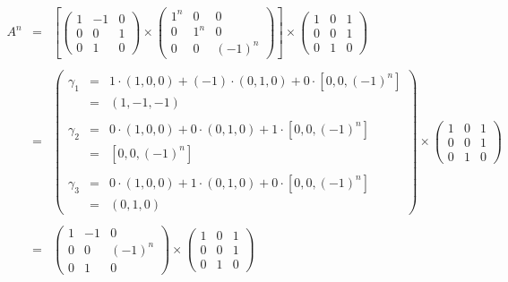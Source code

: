 \begin{enumerate}
    $$\begin{array}{rcl}
	 A^n &=& \left[\left(\begin{array}{*{3}{r}}
	    1 & -1 & 0 \\
	    0 & 0 & 1 \\
	    0 & 1 & 0 
	\end{array}\right) 
	\times 
	\left(\begin{array}{*{3}{llc}}
	    1^n & 0 & 0 \\
	    0 & 1^n & 0 \\
	    0 & 0 & (-1)^n
	\end{array}\right)\right] 
	\times 
	\left(\begin{array}{*{3}{r}}
	    1 & 0 & 1 \\
	    0 & 0 & 1  \\
	    0 & 1 & 0
	\end{array}\right)\\\\
	&=&
	\left(\begin{array}{rcl}
	    \gamma_1 &=& 1\cdot(1,0,0)+(-1)\cdot(0,1,0)+0\cdot\left[0,0,(-1)^n\right]\\
		     &=&(1,-1,-1)\\\\
	    \gamma_2 &=& 0\cdot(1,0,0)+0\cdot(0,1,0)+1\cdot\left[0,0,(-1)^n\right]\\
		     &=&\left[0,0,(-1)^n\right]\\\\
	    \gamma_3 &=& 0\cdot(1,0,0)+1\cdot(0,1,0)+0\cdot\left[0,0,(-1)^n\right]\\
		     &=&(0,1,0)
	\end{array}\right)
	\times 
	\left(\begin{array}{*{3}{r}}
	    1 & 0 & 1 \\
	    0 & 0 & 1  \\
	    0 & 1 & 0
	\end{array}\right)\\\\
	&=&
	\left(\begin{array}{*{3}{r}}
	    1 & -1 & 0 \\
	    0 & 0 & (-1)^n \\
	    0 & 1 & 0
	\end{array}\right)
	\times 
	\left(\begin{array}{*{3}{r}}
	    1 & 0 & 1 \\
	    0 & 0 & 1  \\
	    0 & 1 & 0
	\end{array}\right)\\\\

\end{array}$$
\end{enumerate}
